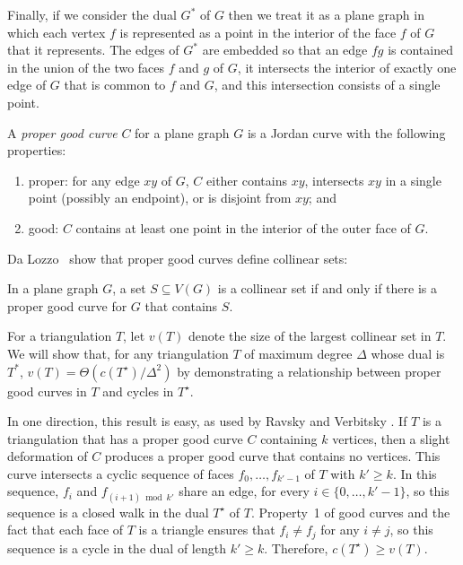\documentclass{patmorin}
\newcommand{\dual}[1]{{#1}^\star}
\begin{document}
Finally, if we consider the dual $G^*$ of $G$ then we treat it as a
plane graph in which each vertex $f$ is represented as a point in the
interior of the face $f$ of $G$ that it represents.  The edges of $G^*$
are embedded so that an edge $fg$ is contained in the union of the two
faces $f$ and $g$ of $G$, it intersects the interior of exactly one
edge of $G$ that is common to $f$ and $G$, and this intersection
consists of a single point.

A \emph{proper good curve} $C$ for a plane graph $G$ is a
Jordan curve with the following properties:
\begin{enumerate}
  \item proper: for any edge $xy$ of $G$, $C$ either contains $xy$, intersects
  $xy$ in a single point (possibly an endpoint), or is disjoint
  from $xy$; and
  \item good: $C$ contains at least one point in the interior of
  the outer face of $G$.
\end{enumerate}

Da Lozzo \etal\ show that proper good curves define collinear sets:

\begin{thm}
  In a plane graph $G$, a set $S\subseteq V(G)$ is a collinear set if
  and only if there is a proper good curve for $G$ that contains $S$.
\end{thm}

For a triangulation $T$, let $v(T)$ denote the size of the largest
collinear set in $T$.  We will show that, for any triangulation $T$
of maximum degree $\Delta$
whose dual is $T^*$, $v(T)=\Theta(c(\dual{T})/\Delta^2)$ by demonstrating a
relationship between proper good curves in $T$ and cycles in $\dual{T}$.

In one direction, this result is easy, as used by Ravsky and Verbitsky
\cite{ravsky.verbitsky:on,ravsky.verbitsky:on-arxiv}.  If $T$ is a
triangulation that has a proper good curve $C$ containing $k$ vertices,
then a slight deformation of $C$ produces a proper good curve that
contains no vertices. This curve intersects a cyclic sequence of faces
$f_0,\ldots,f_{k'-1}$ of $T$ with $k'\ge k$.  In this sequence, $f_i$ and
$f_{(i+1)\bmod k'}$ share an edge, for every $i\in\{0,\ldots,k'-1\}$, so
this sequence is a closed walk in the dual $\dual{T}$ of $T$.  Property~1
of good curves and the fact that each face of $T$ is a triangle ensures
that $f_i\neq f_j$ for any $i\neq j$, so this sequence is a cycle in
the dual of length $k'\ge k$.  Therefore, $c(\dual{T})\ge v(T)$.
\end{document}
